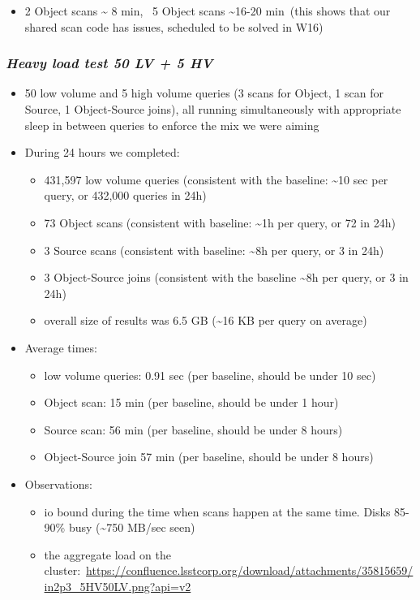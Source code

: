 \begin{itemize}
\item
  2 Object scans \textasciitilde{} 8 min, ~5 Object scans
  \textasciitilde{}16-20 min~(this shows that our shared scan code has
  issues, scheduled to be solved in W16)
\end{itemize}

\subsubsection{\texorpdfstring{\textbf{\emph{Heavy load test 50 LV + 5
HV}}}{Heavy load test 50 LV + 5 HV}}\label{heavy-load-test-50-lv-5-hv}

\begin{itemize}
\item
  50 low volume and 5 high volume queries (3 scans for Object, 1 scan
  for Source, 1 Object-Source joins), all running simultaneously with
  appropriate sleep in between queries to enforce the mix we were aiming
\item
  During 24 hours we completed:

  \begin{itemize}
  \item
    431,597 low volume queries (consistent with the baseline:
    \textasciitilde{}10 sec per query, or 432,000 queries in 24h)
  \item
    73 Object scans (consistent with baseline: \textasciitilde{}1h per
    query, or 72 in 24h)
  \item
    3 Source scans (consistent with baseline: \textasciitilde{}8h per
    query, or 3 in 24h)
  \item
    3 Object-Source joins (consistent with the baseline
    \textasciitilde{}8h per query, or 3 in 24h)
  \item
    overall size of results was 6.5 GB (\textasciitilde{}16 KB per query
    on average)
  \end{itemize}
\item
  Average times:

  \begin{itemize}
  \item
    low volume queries: 0.91 sec (per baseline, should be under 10 sec)
  \item
    Object scan: 15 min (per baseline, should be under 1 hour)
  \item
    Source scan: 56 min (per baseline, should be under 8 hours)
  \item
    Object-Source join 57 min (per baseline, should be under 8 hours)
  \end{itemize}
\item
  Observations:

  \begin{itemize}
  \item
    io bound during the time when scans happen at the same time. Disks
    85-90\% busy (\textasciitilde{}750 MB/sec seen)
  \item
    the aggregate load on the
    cluster:~\url{https://confluence.lsstcorp.org/download/attachments/35815659/in2p3_5HV50LV.png?api=v2}
  \end{itemize}
\end{itemize}

